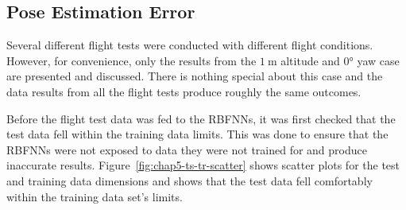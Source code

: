 \subsection{Pose Estimation Error}

Several different flight tests were conducted with different flight conditions. However, for convenience, only the results from the $\SI{1}{\m}$ altitude and $\ang{0}$ yaw case are presented and discussed. There is nothing special about this case and the data results from all the flight tests produce roughly the same outcomes.  

Before the flight test data was fed to the RBFNNs, it was first checked that the test data fell within the training data limits. This was done to ensure that the RBFNNs were not exposed to data they were not trained for and produce inaccurate results. Figure~\ref{fig:chap5-ts-tr-scatter} shows scatter plots for the test and training data dimensions and shows that the test data fell comfortably within the training data set's limits.  

